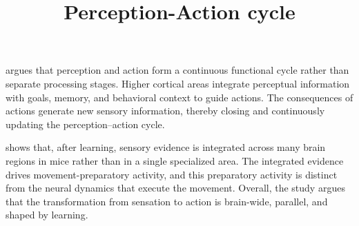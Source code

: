 \documentclass[a4paper]{article}
\title{Perception-Action cycle}
\date{}
\begin{document}
    \maketitle
    \cite{fuster-2004-upper-processing-stages-of-the-perception-action-cycle} argues that perception and action form a continuous functional cycle rather than separate processing stages. Higher cortical areas integrate perceptual information with goals, memory, and behavioral context to guide actions. The consequences of actions generate new sensory information, thereby closing and continuously updating the perception--action cycle.
    
    \cite{khilkevich-2024-brain-wide-dynamics-linking-sensation-to-action-during-decision-making}  shows that, after learning, sensory evidence is integrated across many brain regions in mice rather than in a single specialized area. The integrated evidence drives movement-preparatory activity, and this preparatory activity is distinct from the neural dynamics that execute the movement. Overall, the study argues that the transformation from sensation to action is brain-wide, parallel, and shaped by learning.
    
    
\end{document}
